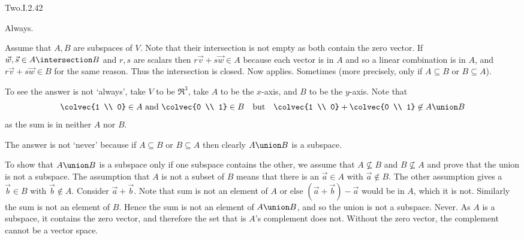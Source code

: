 \begin{ans}{Two.I.2.42}
      \begin{exparts}
        \partsitem Always.

          Assume that \( A,B \) are subspaces of \( V \).
          Note that
          their intersection is not empty as both contain the zero vector.
          If \( \vec{w},\vec{s}\in A\intersection B \) and \( r,s \) are
          scalars then \( r\vec{v}+s\vec{w}\in A \) because
          each vector is in \( A \) and so a linear combination is in \( A \),
          and \(r\vec{v}+s\vec{w}\in B \) for the same reason.
          Thus the intersection is closed.
          Now  applies.
        \partsitem Sometimes (more precisely, only if \( A\subseteq B \) or
          \( B\subseteq A \)).

          To see the answer is not `always', take \( V \) to be \( \Re^3 \),
          take \( A \) to be the $x$-axis, and \( B \) to be the
          \( y \)-axis.
          Note that
          \begin{equation*}
            \colvec{1 \\ 0}\in A \text{ and }\colvec{0 \\ 1}\in B
            \quad\text{but}\quad
            \colvec{1 \\ 0}+\colvec{0 \\ 1}\not\in A\union B
          \end{equation*}
          as the sum is in neither \( A \) nor \( B \).

          The answer is not `never' because if \( A\subseteq B \) or
          \( B\subseteq A \) then clearly \( A\union B \) is a subspace.

          To show that \( A\union B \) is a subspace only if one
          subspace contains the other, we assume that \( A\not\subseteq B \)
          and \( B\not\subseteq A \) and prove that
          the union is not a subspace.
          The assumption that \( A \) is not a subset of \( B \) means that
          there is an \( \vec{a}\in A \) with \( \vec{a}\not\in B \).
          The other assumption gives a \( \vec{b}\in B \) with
          \( \vec{b}\not\in A \).
          Consider \( \vec{a}+\vec{b} \).
          Note that sum is not an element of \( A \) or else
          \( (\vec{a}+\vec{b})-\vec{a} \) would be in \( A \), which it is not.
          Similarly the sum is not an element of \( B \).
          Hence the sum is not an element of \( A\union B \), and so the union
          is not a subspace.
        \partsitem Never.
          As \( A \) is a subspace, it contains the zero vector, and therefore
          the set that is $A$'s complement does not.
          Without the zero vector, the complement cannot be a vector space.
      \end{exparts}
    
\end{ans}
